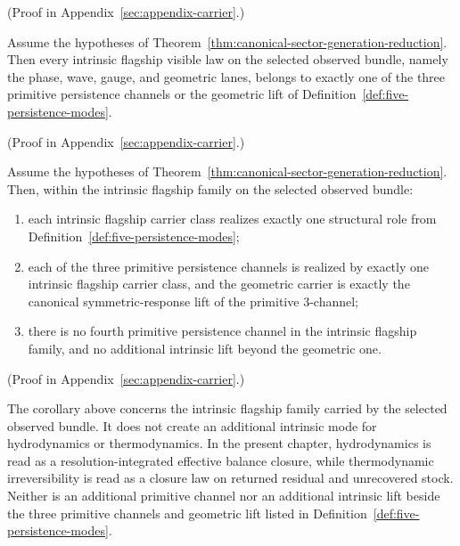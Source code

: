 (Proof in Appendix~\ref{sec:appendix-carrier}.)

\begin{theorem}
\label{thm:flagship-mode-classification}
Assume the hypotheses of
Theorem~\ref{thm:canonical-sector-generation-reduction}. Then every intrinsic
flagship visible law on the selected observed bundle, namely the phase, wave,
gauge, and geometric lanes, belongs to exactly one of the three primitive
persistence channels or the geometric lift of
Definition~\ref{def:five-persistence-modes}.
\end{theorem}

(Proof in Appendix~\ref{sec:appendix-carrier}.)

\begin{corollary}
\label{cor:flagship-family-exhausts-five-persistence-modes}
Assume the hypotheses of
Theorem~\ref{thm:canonical-sector-generation-reduction}. Then, within the
intrinsic flagship family on the selected observed bundle:
\begin{enumerate}[label=(\roman*), leftmargin=2em, itemsep=0.2em]
\item each intrinsic flagship carrier class realizes exactly one structural
      role from Definition~\ref{def:five-persistence-modes};
\item each of the three primitive persistence channels is realized by exactly
      one intrinsic flagship carrier class, and the geometric carrier is
      exactly the canonical symmetric-response lift of the primitive
      \(3\)-channel;
\item there is no fourth primitive persistence channel in the intrinsic
      flagship family, and no additional intrinsic lift beyond the geometric
      one.
\end{enumerate}
\end{corollary}

(Proof in Appendix~\ref{sec:appendix-carrier}.)

\begin{remark}
\label{rem:thermodynamic-closure-not-sixth-mode}
The corollary above concerns the intrinsic flagship family carried by the
selected observed bundle. It does not create an additional intrinsic mode for
hydrodynamics or thermodynamics. In the present chapter, hydrodynamics is read
as a resolution-integrated effective balance closure, while thermodynamic
irreversibility is read as a closure law on returned residual and unrecovered
stock. Neither is an additional primitive channel nor an additional intrinsic
lift beside the three primitive channels and geometric lift listed in
Definition~\ref{def:five-persistence-modes}.
\end{remark}

